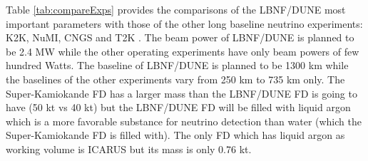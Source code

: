 Table \ref{tab:compareExps} provides the comparisons of the LBNF/DUNE most important parameters with those of the other long baseline neutrino experiments: K2K, NuMI, CNGS and T2K \cite{ref_LBN_OscExpReview}. The beam power of LBNF/DUNE is planned to be 2.4 MW while the other operating experiments have only beam powers of few hundred Watts. The baseline of LBNF/DUNE is planned to be 1300 km while the baselines of the other experiments vary from 250 km to 735 km only. The Super-Kamiokande FD has a larger mass than the LBNF/DUNE FD is going to have (50 kt vs 40 kt) but the LBNF/DUNE FD will be filled with liquid argon which is a more favorable substance for neutrino detection than water (which the Super-Kamiokande FD is filled with). The only FD which has liquid argon as working volume is ICARUS but its mass is only 0.76 kt. \\ \\
